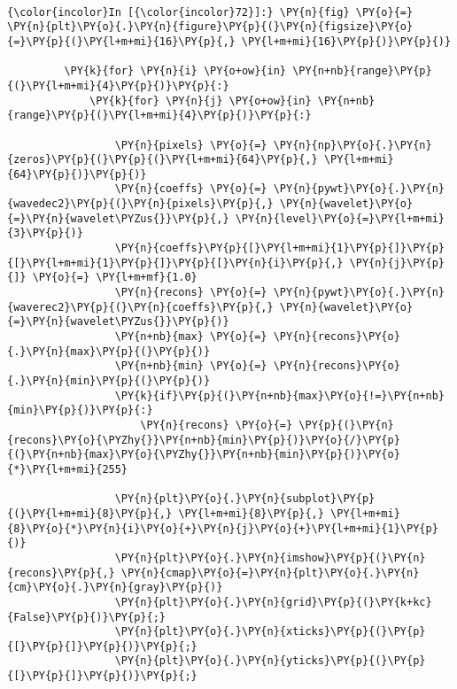     \begin{center}
    \end{center}
    { \hspace*{\fill} \\}
    
    \begin{Verbatim}[commandchars=\\\{\}]
{\color{incolor}In [{\color{incolor}72}]:} \PY{n}{fig} \PY{o}{=} \PY{n}{plt}\PY{o}{.}\PY{n}{figure}\PY{p}{(}\PY{n}{figsize}\PY{o}{=}\PY{p}{(}\PY{l+m+mi}{16}\PY{p}{,} \PY{l+m+mi}{16}\PY{p}{)}\PY{p}{)}
         
         \PY{k}{for} \PY{n}{i} \PY{o+ow}{in} \PY{n+nb}{range}\PY{p}{(}\PY{l+m+mi}{4}\PY{p}{)}\PY{p}{:}
             \PY{k}{for} \PY{n}{j} \PY{o+ow}{in} \PY{n+nb}{range}\PY{p}{(}\PY{l+m+mi}{4}\PY{p}{)}\PY{p}{:}
         
                 \PY{n}{pixels} \PY{o}{=} \PY{n}{np}\PY{o}{.}\PY{n}{zeros}\PY{p}{(}\PY{p}{(}\PY{l+m+mi}{64}\PY{p}{,} \PY{l+m+mi}{64}\PY{p}{)}\PY{p}{)}
                 \PY{n}{coeffs} \PY{o}{=} \PY{n}{pywt}\PY{o}{.}\PY{n}{wavedec2}\PY{p}{(}\PY{n}{pixels}\PY{p}{,} \PY{n}{wavelet}\PY{o}{=}\PY{n}{wavelet\PYZus{}}\PY{p}{,} \PY{n}{level}\PY{o}{=}\PY{l+m+mi}{3}\PY{p}{)}
                 \PY{n}{coeffs}\PY{p}{[}\PY{l+m+mi}{1}\PY{p}{]}\PY{p}{[}\PY{l+m+mi}{1}\PY{p}{]}\PY{p}{[}\PY{n}{i}\PY{p}{,} \PY{n}{j}\PY{p}{]} \PY{o}{=} \PY{l+m+mf}{1.0}
                 \PY{n}{recons} \PY{o}{=} \PY{n}{pywt}\PY{o}{.}\PY{n}{waverec2}\PY{p}{(}\PY{n}{coeffs}\PY{p}{,} \PY{n}{wavelet}\PY{o}{=}\PY{n}{wavelet\PYZus{}}\PY{p}{)}
                 \PY{n+nb}{max} \PY{o}{=} \PY{n}{recons}\PY{o}{.}\PY{n}{max}\PY{p}{(}\PY{p}{)}
                 \PY{n+nb}{min} \PY{o}{=} \PY{n}{recons}\PY{o}{.}\PY{n}{min}\PY{p}{(}\PY{p}{)}
                 \PY{k}{if}\PY{p}{(}\PY{n+nb}{max}\PY{o}{!=}\PY{n+nb}{min}\PY{p}{)}\PY{p}{:}
                     \PY{n}{recons} \PY{o}{=} \PY{p}{(}\PY{n}{recons}\PY{o}{\PYZhy{}}\PY{n+nb}{min}\PY{p}{)}\PY{o}{/}\PY{p}{(}\PY{n+nb}{max}\PY{o}{\PYZhy{}}\PY{n+nb}{min}\PY{p}{)}\PY{o}{*}\PY{l+m+mi}{255}
                     
                 \PY{n}{plt}\PY{o}{.}\PY{n}{subplot}\PY{p}{(}\PY{l+m+mi}{8}\PY{p}{,} \PY{l+m+mi}{8}\PY{p}{,} \PY{l+m+mi}{8}\PY{o}{*}\PY{n}{i}\PY{o}{+}\PY{n}{j}\PY{o}{+}\PY{l+m+mi}{1}\PY{p}{)}
                 \PY{n}{plt}\PY{o}{.}\PY{n}{imshow}\PY{p}{(}\PY{n}{recons}\PY{p}{,} \PY{n}{cmap}\PY{o}{=}\PY{n}{plt}\PY{o}{.}\PY{n}{cm}\PY{o}{.}\PY{n}{gray}\PY{p}{)}
                 \PY{n}{plt}\PY{o}{.}\PY{n}{grid}\PY{p}{(}\PY{k+kc}{False}\PY{p}{)}\PY{p}{;}
                 \PY{n}{plt}\PY{o}{.}\PY{n}{xticks}\PY{p}{(}\PY{p}{[}\PY{p}{]}\PY{p}{)}\PY{p}{;}
                 \PY{n}{plt}\PY{o}{.}\PY{n}{yticks}\PY{p}{(}\PY{p}{[}\PY{p}{]}\PY{p}{)}\PY{p}{;}
\end{Verbatim}


